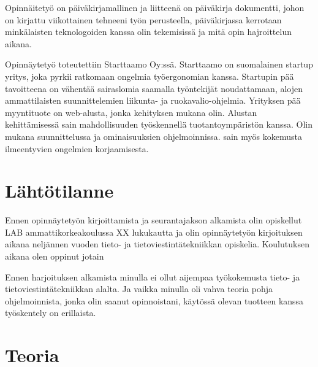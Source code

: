 \documentclass[11pt,a4paper,titlepage,oneside]{article}
\begin{document}
Opinnäitetyö on päiväkirjamallinen ja liitteenä on päiväkirja dokumentti, 
johon on kirjattu viikottainen tehneeni työn perusteella, päiväkirjassa kerrotaan
minkälaisten teknologoiden kanssa olin tekemisissä ja mitä opin hajroittelun aikana.
\medskip


Opinnäytetyö toteutettiin Starttaamo Oy:ssä. Starttaamo on suomalainen startup yritys, joka pyrkii ratkomaan ongelmia työergonomian kanssa.
Startupin pää tavoitteena on vähentää sairaslomia saamalla työntekijät noudattamaan, alojen ammattilaisten suunnittelemien liikunta- ja ruokavalio-ohjelmia. 
Yrityksen pää myyntituote on web-alusta, jonka kehityksen mukana olin.
%
Alustan kehittämisessä sain mahdollisuuden työskennellä tuotantoympäristön kanssa.
Olin mukana suunnittelussa ja ominaisuuksien ohjelmoinnissa. sain myös kokemusta ilmeentyvien ongelmien korjaamisesta.

\medskip






\newpage
\section{Lähtötilanne}         %


Ennen opinnäytetyön kirjoittamista ja seurantajakson alkamista olin opiskellut LAB ammattikorkeakoulussa XX lukukautta ja olin opinnäytetyön kirjoituksen aikana neljännen vuoden tieto- ja tietoviestintätekniikkan opiskelia.
Koulutuksen aikana olen oppinut jotain 

\medskip



Ennen harjoituksen alkamista minulla ei ollut aijempaa työkokemusta tieto- ja tietoviestintätekniikkan alalta.
Ja vaikka minulla oli vahva teoria pohja ohjelmoinnista, jonka olin saanut opinnoistani, 
käytössä olevan tuotteen kanssa työskentely on erillaista.
\medskip







\newpage
\section{Teoria}                %
\end{document}
